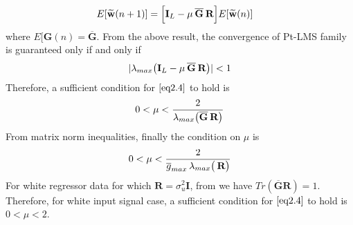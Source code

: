 \documentclass[journal, one column]{IEEEtran}
\begin{document}
\begin{equation}\label{eq2.3}
\begin{split}
E[\widetilde{\textbf{w}}(n+1)]&=\Big[\textbf{I}_{L}-\mu \hspace{0.2em} \overline{\textbf{G}} \hspace{0.2em} \textbf{R}\Big] E[\widetilde{\textbf{w}}(n)]
\end{split}
\end{equation}
where $E[\textbf{G}(n)=\overline{\textbf{G}}$. From the above result, the convergence of Pt-LMS family is guaranteed only if and only if
\begin{equation}\label{eq2.4}
\begin{split}
| \lambda_{max}\big( \textbf{I}_{L}-\mu \hspace{0.2em} \overline{\textbf{G}} \hspace{0.2em} \textbf{R} \big) |< 1
\end{split}
\end{equation}
Therefore, a sufficient condition for $\eqref{eq2.4}$ to hold is
\begin{equation}\label{eq2.5}
\begin{split}
0 < \mu < \frac{2}{\lambda_{max}\big(\overline{\textbf{G}} \hspace{0.2em} \textbf{R} \big)}
\end{split}
\end{equation}
From matrix norm inequalities, finally the condition on $\mu$ is
\begin{equation}\label{eq2.6}
\begin{split}
0 < \mu < \frac{2}{\overline{g}_{max} \hspace{0.2em} \lambda_{max}\big( \hspace{0.2em} \textbf{R} \big)}
\end{split}
\end{equation}
For white regressor data for which $\textbf{R}= \sigma^{2}_{u} \textbf{I}$, from \cite{10} we have $Tr(\overline{\textbf{G}} \textbf{R}) =1$. Therefore, for white input signal case, a sufficient condition for $\eqref{eq2.4}$ to hold is  $0 < \mu < 2$. 
\end{document}
